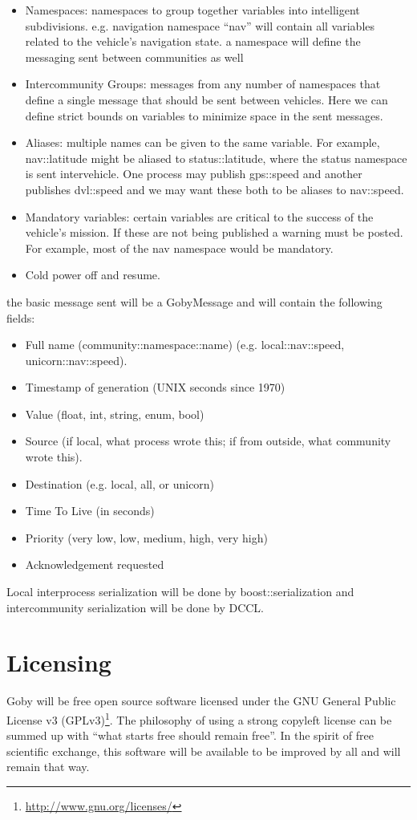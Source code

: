 \documentclass[10pt,letterpaper]{article}
\begin{document}
\begin{itemize}
\item Namespaces: namespaces to group together variables into intelligent subdivisions. e.g. navigation namespace ``nav'' will contain all variables related to the vehicle's navigation state. a namespace will define the messaging sent between communities as well
\item Intercommunity Groups: messages from any number of namespaces that define a single message that should be sent between vehicles. Here we can define strict bounds on variables to minimize space in the sent messages.
\item Aliases: multiple names can be given to the same variable. For example, nav::latitude might be aliased to status::latitude, where the status namespace is sent intervehicle. One process may publish gps::speed and another publishes dvl::speed and we may want these both to be aliases to nav::speed. 
\item Mandatory variables: certain variables are critical to the success of the vehicle's mission. If these are not being published a warning must be posted. For example, most of the nav namespace would be mandatory.
\item Cold power off and resume.
\end{itemize}

the basic message sent will be a GobyMessage and will contain the following fields:
\begin{itemize}
\item Full name (community::namespace::name) (e.g. local::nav::speed, unicorn::nav::speed). 
\item Timestamp of generation (UNIX seconds since 1970)
\item Value (float, int, string, enum, bool)
\item Source (if local, what process wrote this; if from outside, what community wrote this).
\item Destination (e.g. local, all, or unicorn)
\item Time To Live (in seconds)
\item Priority (very low, low, medium, high, very high)
\item Acknowledgement requested
\end{itemize}

Local interprocess serialization will be done by boost::serialization and intercommunity serialization will be done by DCCL.

\section{Licensing}
Goby will be free open source software licensed under the GNU General Public License v3 (GPLv3)\footnote{\url{http://www.gnu.org/licenses/}}. The philosophy of using a strong copyleft license can be summed up with ``what starts free should remain free''. In the spirit of free scientific exchange, this software will be available to be improved by all and will remain that way.
\end{document}
